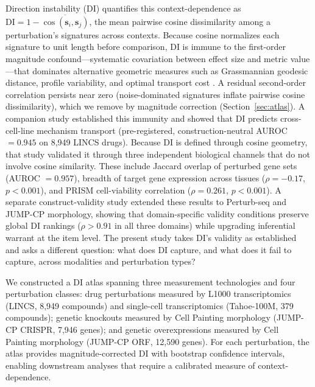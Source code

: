 \documentclass[11pt]{article}
\begin{document}
Direction instability (DI) quantifies this context-dependence as
$\mathrm{DI} = 1 - \overline{\cos(\mathbf{s}_i, \mathbf{s}_j)}$, the
mean pairwise cosine dissimilarity among a perturbation's signatures
across contexts.  Because cosine normalizes each signature to unit
length before comparison, DI is immune to the first-order magnitude
confound---systematic covariation between effect size and metric
value---that dominates alternative geometric measures such as
Grassmannian geodesic distance, profile variability, and optimal
transport cost \citep{tower2026confound}.  A residual second-order
correlation persists near zero (noise-dominated signatures inflate
pairwise cosine dissimilarity), which we remove by magnitude correction
(Section~\ref{sec:atlas}).  A companion study \citep{tower2026confound}
established this immunity and showed that DI predicts
cross-cell-line mechanism transport (pre-registered,
construction-neutral AUROC $= 0.945$ on 8{,}949 LINCS drugs).  Because DI is defined through cosine
geometry, that study validated it through three independent biological
channels that do not involve cosine similarity.  These include Jaccard
overlap of perturbed gene sets (AUROC $= 0.957$), breadth of target gene
expression across tissues ($\rho = -0.17$, $p < 0.001$), and PRISM
cell-viability correlation ($\rho = 0.261$, $p < 0.001$).  A separate
construct-validity study \citep{tower2026validity} extended these results
to Perturb-seq and JUMP-CP morphology, showing that domain-specific
validity conditions preserve global DI rankings ($\rho > 0.91$ in all
three domains) while upgrading inferential warrant at the item level.
The present study takes DI's validity as established and asks a
different question: what does DI capture, and what does it fail to
capture, across modalities and perturbation types?

We constructed a DI atlas spanning three measurement technologies and
four perturbation classes: drug perturbations measured by L1000
transcriptomics (LINCS, 8{,}949 compounds) and single-cell
transcriptomics (Tahoe-100M, 379 compounds); genetic knockouts measured
by Cell Painting morphology (JUMP-CP CRISPR, 7{,}946 genes); and
genetic overexpressions measured by Cell Painting morphology (JUMP-CP
ORF, 12{,}590 genes).  For each perturbation, the atlas provides
magnitude-corrected DI with bootstrap confidence intervals, enabling
downstream analyses that require a calibrated measure of
context-dependence.
\end{document}
